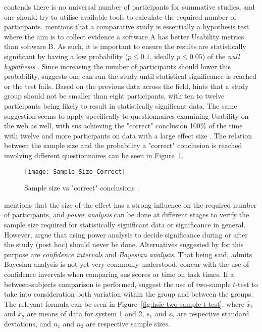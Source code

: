\textcite{Lewis_2014} contends there is no universal number of participants for summative studies, and one should try to utilise available tools to calculate the required number of participants.
\textcite{Macefield_2009} mentions that a comparative study is essentially a hypothesis test where the aim is to collect evidence a software A has better Usability metrics than software B.
As such, it is important to ensure the results are statistically significant by having a low probability ($p \leq 0.1 $, ideally $p \leq 0.05 $) of the \textit{null hypothesis} \parencite{Macefield_2009}.
Since increasing the number of participants should lower this probability, \textcite{Macefield_2009} suggests one can run the study until statistical significance is reached or the test fails.
Based on the previous data across the field, \textcite{Macefield_2009} hints that a study group should not be smaller than eight participants, with ten to twelve participants being likely to result in statistically significant data.
The same suggestion seems to apply specifically to questionnaires examining Usability on the web as well, with \gls{sus} achieving the "correct" conclusion 100\% of the time with twelve and more participants on data with a large effect size \parencite{tullis_comparison_2004}.
The relation between the sample size and the probability a "correct" conclusion is reached involving different questionnaires can be seen in Figure~\ref{fig:hsie-questionnaire-sample-size}.

\begin{figure}[H]
    \centering
    \texttt{[image: Sample\_Size\_Correct]}
    \caption{Sample size vs "correct" conclusions \parencite{tullis_comparison_2004}.}
    \label{fig:hsie-questionnaire-sample-size}
\end{figure}

\textcite{Macefield_2009} mentions that the size of the effect has a strong influence on the required number of participants, and \textit{power analysis} can be done at different stages to verify the sample size required for statistically significant data or significance in general.
However, \textcite{Dziak_Dierker_Abar_2020} argue that using power analysis to decide significance during or after the study (post hoc) should never be done.
Alternatives suggested by \textcite{Dziak_Dierker_Abar_2020} for this purpose are \textit{confidence intervals} and \textit{Bayesian analysis}.
That being said, \textcite{Dziak_Dierker_Abar_2020} admits Bayesian analysis is not yet very commonly understood.
\textcite{sauro_chapter5_2016} concur with the use of confidence invervals when comparing \gls{sus} scores or time on task times.
If a between-subjects comparison is performed, \textcite{sauro_chapter5_2016} suggest the use of two-sample $t$-test to take into consideration both variation within the group and between the groups.
The relevant formula can be seen in Figure~\ref{fig:hsie-two-sample-t-test}, where $\hat{x}_1$ and $\hat{x}_2$ are means of data for system 1 and 2, $s_1$ and $s_2$ are respective standard deviations, and $n_1$ and $n_2$ are respective sample sizes.

